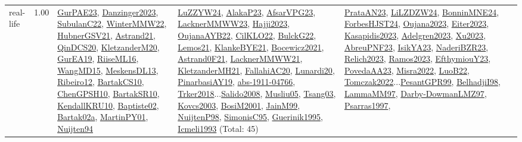{\begin{longtable}{p{3cm}r>{\raggedright\arraybackslash}p{6cm}>{\raggedright\arraybackslash}p{6cm}>{\raggedright\arraybackslash}p{8cm}}
\index{real-life}\index{Benchmarks!real-life}real-life &  1.00 & \hyperref[detail:GurPAE23]{GurPAE23}, \hyperref[detail:Danzinger2023]{Danzinger2023}, \hyperref[detail:SubulanC22]{SubulanC22}, \hyperref[detail:WinterMMW22]{WinterMMW22}, \hyperref[detail:HubnerGSV21]{HubnerGSV21}, \hyperref[detail:Astrand21]{Astrand21}, \hyperref[detail:QinDCS20]{QinDCS20}, \hyperref[detail:KletzanderM20]{KletzanderM20}, \hyperref[detail:GurEA19]{GurEA19}, \hyperref[detail:RiiseML16]{RiiseML16}, \hyperref[detail:WangMD15]{WangMD15}, \hyperref[detail:MeskensDL13]{MeskensDL13}, \hyperref[detail:Ribeiro12]{Ribeiro12}, \hyperref[detail:BartakCS10]{BartakCS10}, \hyperref[detail:ChenGPSH10]{ChenGPSH10}, \hyperref[detail:BartakSR10]{BartakSR10}, \hyperref[detail:KendallKRU10]{KendallKRU10}, \hyperref[detail:Baptiste02]{Baptiste02}, \hyperref[detail:Bartak02a]{Bartak02a}, \hyperref[detail:MartinPY01]{MartinPY01}, \hyperref[detail:Nuijten94]{Nuijten94} & \hyperref[detail:LuZZYW24]{LuZZYW24}, \hyperref[detail:AlakaP23]{AlakaP23}, \hyperref[detail:AfsarVPG23]{AfsarVPG23}, \hyperref[detail:LacknerMMWW23]{LacknerMMWW23}, \hyperref[detail:Hajji2023]{Hajji2023}, \hyperref[detail:OujanaAYB22]{OujanaAYB22}, \hyperref[detail:CilKLO22]{CilKLO22}, \hyperref[detail:BulckG22]{BulckG22}, \hyperref[detail:Lemos21]{Lemos21}, \hyperref[detail:KlankeBYE21]{KlankeBYE21}, \hyperref[detail:Bocewicz2021]{Bocewicz2021}, \hyperref[detail:Astrand0F21]{Astrand0F21}, \hyperref[detail:LacknerMMWW21]{LacknerMMWW21}, \hyperref[detail:KletzanderMH21]{KletzanderMH21}, \hyperref[detail:FallahiAC20]{FallahiAC20}, \hyperref[detail:Lunardi20]{Lunardi20}, \hyperref[detail:PinarbasiAY19]{PinarbasiAY19}, \hyperref[detail:abs-1911-04766]{abs-1911-04766}, \hyperref[detail:Trker2018]{Trker2018}...\hyperref[detail:Salido2008]{Salido2008}, \hyperref[detail:Musliu05]{Musliu05}, \hyperref[detail:Tsang03]{Tsang03}, \hyperref[detail:Kovcs2003]{Kovcs2003}, \hyperref[detail:BosiM2001]{BosiM2001}, \hyperref[detail:JainM99]{JainM99}, \hyperref[detail:NuijtenP98]{NuijtenP98}, \hyperref[detail:SimonisC95]{SimonisC95}, \hyperref[detail:Guerinik1995]{Guerinik1995}, \hyperref[detail:Icmeli1993]{Icmeli1993} (Total: 45) & \hyperref[detail:PrataAN23]{PrataAN23}, \hyperref[detail:LiLZDZW24]{LiLZDZW24}, \hyperref[detail:BonninMNE24]{BonninMNE24}, \hyperref[detail:ForbesHJST24]{ForbesHJST24}, \hyperref[detail:Oujana2023]{Oujana2023}, \hyperref[detail:Eiter2023]{Eiter2023}, \hyperref[detail:Kasapidis2023]{Kasapidis2023}, \hyperref[detail:Adelgren2023]{Adelgren2023}, \hyperref[detail:Xu2023]{Xu2023}, \hyperref[detail:AbreuPNF23]{AbreuPNF23}, \hyperref[detail:IsikYA23]{IsikYA23}, \hyperref[detail:NaderiBZR23]{NaderiBZR23}, \hyperref[detail:Relich2023]{Relich2023}, \hyperref[detail:Ramos2023]{Ramos2023}, \hyperref[detail:EfthymiouY23]{EfthymiouY23}, \hyperref[detail:PovedaAA23]{PovedaAA23}, \hyperref[detail:Misra2022]{Misra2022}, \hyperref[detail:LuoB22]{LuoB22}, \hyperref[detail:Tomczak2022]{Tomczak2022}...\hyperref[detail:PesantGPR99]{PesantGPR99}, \hyperref[detail:BelhadjiI98]{BelhadjiI98}, \hyperref[detail:LammaMM97]{LammaMM97}, \hyperref[detail:Darby-DowmanLMZ97]{Darby-DowmanLMZ97}, \hyperref[detail:Psarras1997]{Psarras1997}, 
\end{longtable}}
